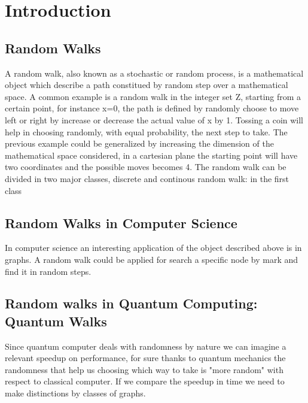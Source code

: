 \section{Introduction}
\subsection{Random Walks}
A random walk, also known as a stochastic or random process, is a mathematical object which describe a path constitued by random step over a mathematical space. A common 
example is a random walk in the integer set Z, starting from a certain point, for instance x=0, the path is defined by randomly choose to move left or right by increase 
or decrease the actual value of x by 1. Tossing a coin will help in choosing randomly, with equal probability, the next step to take. 
The previous example could be generalized by increasing the dimension of the mathematical space considered, in a cartesian plane the starting point will have two  
coordinates and the possible moves becomes 4.
The random walk can be divided in two major classes, discrete and continous random walk: in the first class 


\subsection{Random Walks in Computer Science}
In computer science an interesting application of the object described above is in graphs. A random walk could be applied for search a specific node 
by mark and find it in random steps. %

\subsection{Random walks in Quantum Computing: Quantum Walks}
Since quantum computer deals with randomness by nature we can imagine a relevant speedup on performance, for sure thanks to quantum mechanics the randomness
that help us choosing which way to take is "more random" with respect to classical computer. If we compare the speedup in time we need to make distinctions
by classes of graphs.  %


